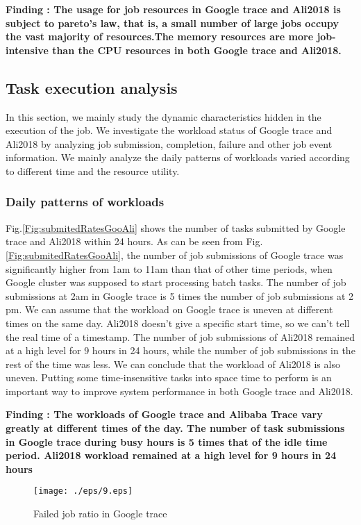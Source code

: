 \documentclass[conference]{IEEEtran}
\begin{document}
{\bfseries Finding \theFindingcounter: The usage for job resources in Google trace and Ali2018 is subject to pareto's law, that is, a small number of large jobs occupy the vast majority of resources.The memory resources are more job-intensive than the CPU resources in both Google trace and Ali2018.}

\subsection{Task execution analysis}
In this section, we mainly study the dynamic characteristics hidden in the execution of the job. We investigate the workload status of Google trace and Ali2018 by analyzing job submission, completion, failure and other job event information. We mainly analyze the daily patterns of workloads varied according to different time and the resource utility.

\subsubsection{Daily patterns of workloads}
Fig.\ref{Fig:submitedRatesGooAli} shows the number of tasks submitted by Google trace and Ali2018 within 24 hours. As can be seen from  Fig. \ref{Fig:submitedRatesGooAli}, the number of job submissions of Google trace was significantly higher from 1am to 11am than that of other time periods, when Google cluster was supposed to start processing batch tasks. The number of job submissions at 2am in Google trace is 5 times the number of job submissions at 2 pm. We can assume that the workload on Google trace is uneven at different times on the same day. Ali2018 doesn't give a specific start time, so we can't tell the real time of a timestamp. The number of job submissions of Ali2018 remained at a high level for 9 hours in 24 hours, while the number of job submissions in the rest of the time was less. We can conclude that the workload of Ali2018 is also uneven. Putting some time-insensitive tasks into space time to perform is an important way to improve system performance in both Google trace and Ali2018.

{\bfseries Finding \theFindingcounter: The workloads of Google trace and Alibaba Trace vary greatly at different times of the day. The number of task submissions in Google trace during busy hours is 5 times that of the idle time period. Ali2018 workload remained at a high level for 9 hours in 24 hours}
\begin{figure}[htbp]
\centerline{\texttt{[image: ./eps/9.eps]}}
\caption{Failed job ratio in Google trace}
\label{Fig:FailedRation}
\end{figure}
\end{document}
